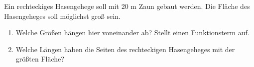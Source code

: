\documentclass{cssheet}
\begin{document}
\begin{aufgabe}[Hasengehege]
	Ein rechteckiges Hasengehege soll mit 20 m Zaun
	gebaut werden. Die Fläche des Hasengeheges soll möglichst
	groß sein. 
	\begin{enumerate}
		\item Welche Größen hängen hier voneinander ab? Stellt einen Funktionsterm auf.
		\item Welche Längen haben die Seiten des rechteckigen Hasengeheges mit der größten Fläche?
	\end{enumerate}
\end{aufgabe}

\vspace*{10mm}
\printlicense

\printsocials
\end{document}
